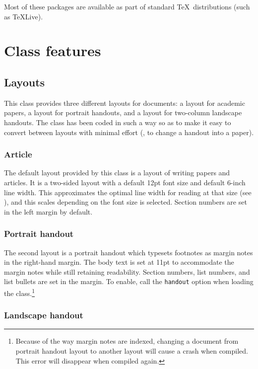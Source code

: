 \documentclass[11pt, tipa, color]{./lingdoc}
\newcommand{\Option}[1]{\texttt{#1}}
\begin{document}
    \noindent Most of these packages are available as part of standard \TeX\ distributions (such as \TeX{}Live).
        
  \section{Class features}

  \subsection{Layouts}
  
    This class provides three different layouts for documents: a layout for academic papers, a layout for portrait handouts, and a layout for two-column landscape handouts. The class has been coded in such a way so as to make it easy to convert between layouts with minimal effort (\eg, to change a handout into a paper).
  
  \subsubsection{Article}
  
    The default layout provided by this class is a layout of writing papers and articles. It is a two-sided layout with a default 12pt font size and default 6-inch line width. This approximates the optimal line width for reading at that size (see \citealp[]{Bringhurst:2008}), and this scales depending on the font size is selected. Section numbers are set in the left margin by default. 
  
  \subsubsection{Portrait handout}
  
    The second layout is a portrait handout which typesets footnotes as margin notes in the right-hand margin. The body text is set at 11pt to accommodate the margin notes while still retaining readability. Section numbers, list numbers, and list bullets are set in the margin. To enable, call the \Option{handout} option when loading the class.\footnote{Because of the way margin notes  are indexed, changing a document from portrait handout layout to another layout will cause a crash when compiled. This error will disappear when compiled again.}
  
  \subsubsection{Landscape handout}
  
\end{document}

